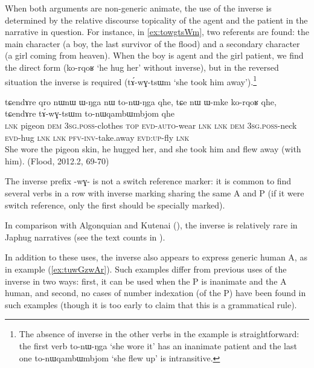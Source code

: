 \documentclass[oldfontcommands,oneside,a4paper,11pt]{article}
\newcommand{\ipa}[1]{{\phon \mbox{#1}}} %
\begin{document}
 
When both arguments are non-generic animate, the use of the inverse is determined by the relative discourse topicality of the agent and the patient in the narrative in question. For instance, in \ref{ex:towgtsWm}, two referents are found: the main character (a boy, the last survivor of the flood) and a secondary character (a girl coming from heaven). When the boy is agent and the girl patient, we find the direct form (\ipa{ko-rqoʁ}  `he hug her' without inverse), but in the reversed situation the inverse is required (\ipa{tɤ́-wɣ-tsɯm} `she took him away').\footnote{The absence of inverse in the other verbs in the example is straightforward: the first verb 	\ipa{to-nɯ-ŋga}  `she wore it' has an inanimate patient and the last one \ipa{to-nɯqambɯmbjom}  `she flew up' is intransitive. }

 \begin{exe}
\ex \label{ex:towgtsWm} 
\gll
\ipa{tɕendɤre} 	\ipa{qro} 	\ipa{nɯnɯ} 	\ipa{ɯ-ŋga} 	\ipa{nɯ} 	\ipa{to-nɯ-ŋga} 	\ipa{qhe,}  \ipa{tɕe} 	\ipa{nɯ} 	\ipa{ɯ-mke} 	\ipa{ko-rqoʁ} 	\ipa{qhe,} \ipa{tɕendɤre} 	\ipa{tɤ́-wɣ-tsɯm} 	\ipa{to-nɯqambɯmbjom} 	\ipa{qhe} \\
\textsc{lnk} pigeon \textsc{dem} \textsc{3sg.poss}-clothes \textsc{top} \textsc{evd-auto}-wear \textsc{lnk} \textsc{lnk} \textsc{dem} \textsc{3sg.poss}-neck \textsc{evd}-hug \textsc{lnk} \textsc{lnk} \textsc{pfv-inv}-take.away \textsc{evd:up}-fly \textsc{lnk} \\
\glt She wore the pigeon skin, he hugged her, and she took him and flew away (with him). (Flood, 2012.2, 69-70)
\end{exe}

The inverse prefix \ipa{-wɣ-} is not a switch reference marker: it is common to find several verbs in a row with inverse marking sharing the same A and P (if it were switch reference, only the first should be specially marked).

In comparison with Algonquian and Kutenai (\citealt{dryer94inverse}), the inverse is relatively rare in Japhug narratives (see the text counts in \citealt{jacques10inverse}).

In addition to these uses, the inverse also appears to express generic human A, as in example (\ref{ex:tuwGzwAr}). Such examples differ from previous uses of the inverse in two ways: first, it can be used when the P is inanimate and the A human, and second, no cases of number indexation (of the P) have been found in such examples (though it is too early to claim that this is a grammatical rule). 
\end{document}
